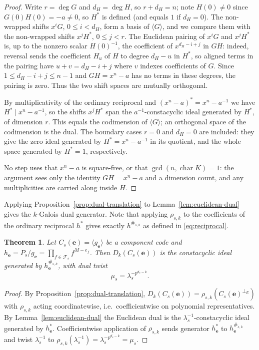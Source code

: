 \documentclass[11pt,a4paper]{article}
\newcommand{\Fs}{\mathcal F_s}
\newcommand{\Dk}{D_k}
\newcommand{\perpE}{\perp_{E}}
\numberwithin{equation}{section}
\theoremstyle{plain}
\newtheorem{theorem}{Theorem}[section]
\theoremstyle{definition}
\theoremstyle{remark}
\begin{document}
\begin{proof}
Write $r=\deg G$ and $d_H=\deg H$, so $r+d_H=n$; note $H(0)\neq0$ since
$G(0)H(0)=-a\neq0$, so $H^\ast$ is defined (and equals $1$ if $d_H=0$).  The
non-wrapped shifts $x^iG$, $0\leq i<d_H$, form a basis of $\langle G\rangle$,
and we compare them with the non-wrapped shifts $x^jH^\ast$, $0\leq j<r$.  The
Euclidean pairing of $x^iG$ and $x^jH^\ast$ is, up to the nonzero scalar
$H(0)^{-1}$, the coefficient of $x^{d_H-i+j}$ in $GH$: indeed, reversal sends
the coefficient $H_u$ of $H$ to degree $d_H-u$ in $H^\ast$, so aligned terms in
the pairing have $u+v=d_H-i+j$ where $v$ indexes coefficients of $G$.  Since
$1\leq d_H-i+j\leq n-1$ and $GH=x^n-a$ has no terms in these degrees, the
pairing is zero.  Thus the two shift spaces are mutually orthogonal.

By multiplicativity of the ordinary reciprocal and
$(x^n-a)^\ast=x^n-a^{-1}$ we have $H^\ast\mid x^n-a^{-1}$, so the shifts
$x^jH^\ast$ span the $a^{-1}$-constacyclic ideal generated by $H^\ast$, of
dimension $r$.  This equals the codimension of $\langle G\rangle$; an
orthogonal space of the codimension is the dual.  The boundary cases
$r=0$ and $d_H=0$ are included: they give the zero ideal generated by
$H^\ast=x^n-a^{-1}$ in its quotient, and the whole space generated by
$H^\ast=1$, respectively.

No step uses that $x^n-a$ is square-free, or that $\gcd(n,\operatorname{char}K)=1$:
the argument sees only the identity $GH=x^n-a$ and a dimension count, and any
multiplicities are carried along inside $H$.
\end{proof}

Applying Proposition~\ref{prop:dual-translation} to
Lemma~\ref{lem:euclidean-dual} gives the $k$-Galois dual generator.  Note that
applying $\rho_{s,k}$ to the coefficients of the ordinary reciprocal $h^\ast$
gives exactly $h^{\#_{s,k}}$ as defined in \eqref{eq:reciprocal}.

\begin{theorem}\label{thm:dual-generator}
Let $C_s(\mathbf{e})=\langle g_{\mathbf{e}}\rangle$ be a component code and
$h_{\mathbf{e}}=P_s/g_{\mathbf{e}}=\prod_{f\in\Fs}f^{M-e_f}$.  Then
$\Dk(C_s(\mathbf{e}))$ is the constacyclic ideal generated by
$h_{\mathbf{e}}^{\#_{s,k}}$, with dual twist
\[
\mu_s=\lambda_s^{-p^{d_s-k}}.
\]
\end{theorem}

\begin{proof}
By Proposition~\ref{prop:dual-translation},
$\Dk(C_s(\mathbf{e}))=\rho_{s,k}(C_s(\mathbf{e})^{\perpE})$ with $\rho_{s,k}$
acting coordinatewise, i.e.\ coefficientwise on polynomial representatives.
By Lemma~\ref{lem:euclidean-dual} the Euclidean dual is the
$\lambda_s^{-1}$-constacyclic ideal generated by $h_{\mathbf{e}}^\ast$.
Coefficientwise application of $\rho_{s,k}$ sends generator
$h_{\mathbf{e}}^\ast$ to $h_{\mathbf{e}}^{\#_{s,k}}$ and twist $\lambda_s^{-1}$
to $\rho_{s,k}(\lambda_s^{-1})=\lambda_s^{-p^{d_s-k}}=\mu_s$.
\end{proof}
\end{document}
